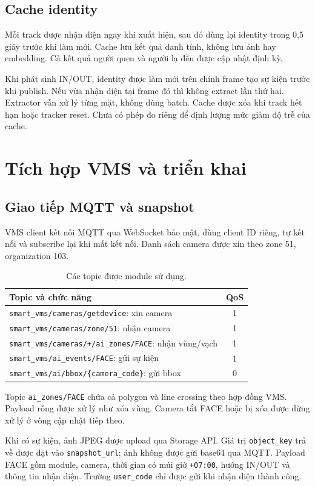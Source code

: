 \documentclass[11pt,a4paper]{article}
\begin{document}
\subsection{Cache identity}
Mỗi track được nhận diện ngay khi xuất hiện, sau đó dùng lại identity trong 0,5 giây trước khi làm mới. Cache lưu kết quả danh tính, không lưu ảnh hay embedding. Cả kết quả người quen và người lạ đều được cập nhật định kỳ.

Khi phát sinh IN/OUT, identity được làm mới trên chính frame tạo sự kiện trước khi publish. Nếu vừa nhận diện tại frame đó thì không extract lần thứ hai. Extractor vẫn xử lý từng mặt, không dùng batch. Cache được xóa khi track hết hạn hoặc tracker reset. Chưa có phép đo riêng để định lượng mức giảm độ trễ của cache.

\section{Tích hợp VMS và triển khai}
\subsection{Giao tiếp MQTT và snapshot}
VMS client kết nối MQTT qua WebSocket bảo mật, dùng client ID riêng, tự kết nối và subscribe lại khi mất kết nối. Danh sách camera được xin theo zone 51, organization 103.

\begin{table}[ht]
\centering\small
\begin{tabularx}{\linewidth}{@{}Y c@{}}
\toprule
Topic và chức năng & QoS\\
\midrule
\texttt{smart\_vms/cameras/getdevice}: xin camera & 1\\
\texttt{smart\_vms/cameras/zone/51}: nhận camera & 1\\
\texttt{smart\_vms/cameras/+/ai\_zones/FACE}: nhận vùng/vạch & 1\\
\texttt{smart\_vms/ai\_events/FACE}: gửi sự kiện & 1\\
\texttt{smart\_vms/ai/bbox/\{camera\_code\}}: gửi bbox & 0\\
\bottomrule
\end{tabularx}
\caption{Các topic được module sử dụng.}
\end{table}

Topic \texttt{ai\_zones/FACE} chứa cả polygon và line crossing theo hợp đồng VMS. Payload rỗng được xử lý như xóa vùng. Camera tắt FACE hoặc bị xóa được dừng xử lý ở vòng cập nhật tiếp theo.

Khi có sự kiện, ảnh JPEG được upload qua Storage API. Giá trị \texttt{object\_key} trả về được đặt vào \texttt{snapshot\_url}; ảnh không được gửi base64 qua MQTT. Payload FACE gồm module, camera, thời gian có múi giờ \texttt{+07:00}, hướng IN/OUT và thông tin nhận diện. Trường \texttt{user\_code} chỉ được gửi khi nhận diện thành công.
\end{document}
